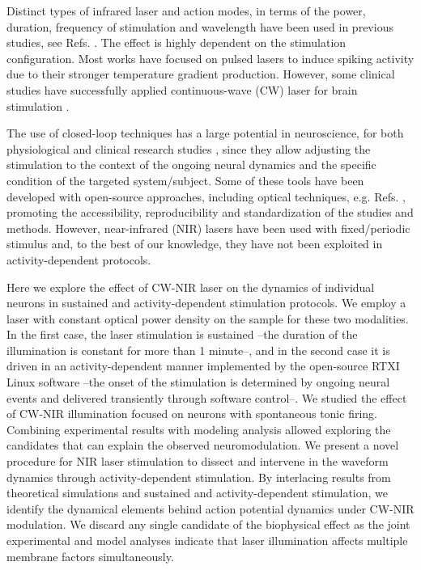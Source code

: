Distinct types of infrared laser and action modes, in terms of the power, duration, frequency of stimulation and wavelength have been used in previous studies, see Refs. \cite{izzo_optical_2007, wells_application_2005,ping_targeted_2023}. The effect is highly dependent on the stimulation configuration. Most works have focused on pulsed lasers to induce spiking activity due to their stronger temperature gradient production. However, some clinical studies have successfully applied continuous-wave (CW) laser for brain stimulation \parencite{saucedo_transcranial_2021}.

The use of closed-loop techniques has a large potential in neuroscience, for both physiological and clinical research studies \parencite{potter2010, chamorro_generalization_2012, couto_firing_2015,lareo_temporal_2016,varona_online_2016,zrenner_closed-loop_2016,reyes-sanchez_automatic_2020,reyes-sanchez_automatized_2023}, since they allow adjusting the stimulation to the context of the ongoing neural dynamics and the specific condition of the targeted system/subject. Some of these tools have been developed with open-source approaches, including optical techniques, e.g. Refs. \parencite{siegle_neural_2015,dagnew_cerebralux_2017,amaducci_rthybrid_2019,stih_stytra_2019,robbins_optogenie_2021}, promoting the accessibility, reproducibility and standardization of the studies and methods. However, near-infrared (NIR) lasers have been used with fixed/periodic stimulus and, to the best of our knowledge, they have not been exploited in activity-dependent protocols. 

Here we explore the effect of CW-NIR laser on the dynamics of individual neurons in sustained and activity-dependent stimulation protocols. We employ a laser with constant optical power density on the sample for these two modalities. In the first case, the laser stimulation is sustained --the duration of the illumination is constant for more than 1 minute--, and in the second case it is driven in an activity-dependent manner implemented by the open-source RTXI\parencite{patel_hard_2017} Linux software --the onset of the stimulation is determined by ongoing neural events and delivered transiently through software control--.
We studied the effect of CW-NIR illumination focused on neurons with spontaneous tonic firing. Combining experimental results with modeling analysis allowed exploring the candidates that can explain the observed neuromodulation. We present a novel procedure for NIR laser stimulation to dissect and intervene in the waveform dynamics through activity-dependent stimulation. By interlacing results from theoretical simulations and sustained and activity-dependent stimulation, we identify the dynamical elements behind action potential dynamics under CW-NIR modulation. We discard any single candidate of the biophysical effect as the joint experimental and model analyses indicate that laser illumination affects multiple membrane factors simultaneously.
